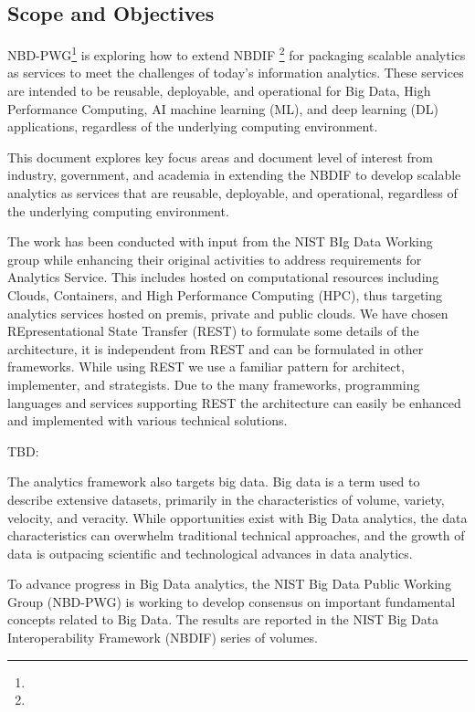 \subsection{Scope and Objectives}

NBD-PWG\footnote{} is exploring how to extend NBDIF \footnote{} for packaging scalable
analytics as services to meet the challenges of today's information
analytics. These services are intended to be reusable, deployable, and
operational for Big Data, High Performance Computing, AI machine
learning (ML), and deep learning (DL) applications, regardless of the
underlying computing environment.

This document explores key focus areas and document level of interest
from industry, government, and academia in extending the NBDIF to
develop scalable analytics as services that are reusable, deployable,
and operational, regardless of the underlying computing environment.


The work has been conducted with input from the NIST BIg Data Working
group while enhancing their original activities to address
requirements for Analytics Service. This includes hosted on
computational resources including Clouds, Containers, and High
Performance Computing (HPC), thus targeting analytics services hosted
on premis, private and public clouds. We have chosen REpresentational
State Transfer (REST) to formulate some details of the architecture,
it is independent from REST and can be formulated in other
frameworks. While using REST we use a familiar pattern for architect,
implementer, and strategists. Due to the many frameworks, programming
languages and services supporting REST the architecture can easily be
enhanced and implemented with various technical solutions.


TBD:

The
analytics framework also targets big data.
Big data is a term used to
describe extensive datasets, primarily in the characteristics of
volume, variety, velocity, and veracity. While opportunities exist
with Big Data analytics, the data characteristics can overwhelm
traditional technical approaches, and the growth of data is outpacing
scientific and technological advances in data analytics.

To advance
progress in Big Data analytics, the NIST Big Data Public Working Group
(NBD-PWG) is working to develop consensus on important fundamental
concepts related to Big Data. The results are reported in the NIST Big
Data Interoperability Framework (NBDIF) series of volumes.

